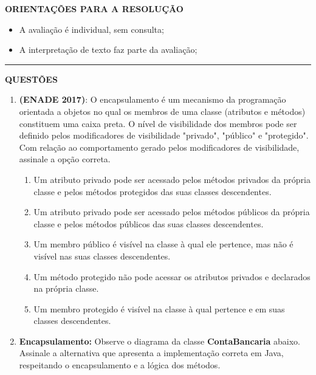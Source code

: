 \documentclass[12pt,a4paper]{article}
\begin{document}
\textbf{ORIENTAÇÕES PARA A RESOLUÇÃO}  

\begin{itemize}
    \item A avaliação é individual, sem consulta;
    \item A interpretação de texto faz parte da avaliação;
\end{itemize}

\vspace{0.5cm}

\begin{center}
    \rule{\textwidth}{0.4pt}
    \textbf{QUESTÕES}
\end{center}

\vspace{0.5cm} 

\begin{enumerate}
    \item \textbf{(ENADE 2017)}: O encapsulamento é um mecanismo da programação orientada a objetos no qual os membros de uma classe (atributos e métodos) constituem uma caixa preta. O nível de visibilidade dos membros pode ser definido pelos modificadores de visibilidade "privado", "público" e "protegido". Com relação ao comportamento gerado pelos modificadores de visibilidade, assinale a opção correta. 
    \begin{enumerate}[label=\Alph*)]
        \item Um atributo privado pode ser acessado pelos métodos privados da própria classe e pelos métodos protegidos das suas classes descendentes.
        \item Um atributo privado pode ser acessado pelos métodos públicos da própria classe e pelos métodos públicos das suas classes descendentes.
        \item Um membro público é visível na classe à qual ele pertence, mas não é visível nas suas classes descendentes.
        \item Um método protegido não pode acessar os atributos privados e declarados na própria classe.
        \item Um membro protegido é visível na classe à qual pertence e em suas classes descendentes.
    \end{enumerate}

    \item \textbf{Encapsulamento:} Observe o diagrama da classe \textbf{ContaBancaria} abaixo. Assinale a alternativa que apresenta a implementação correta em Java, respeitando o encapsulamento e a lógica dos métodos.


\end{enumerate}
\end{document}
